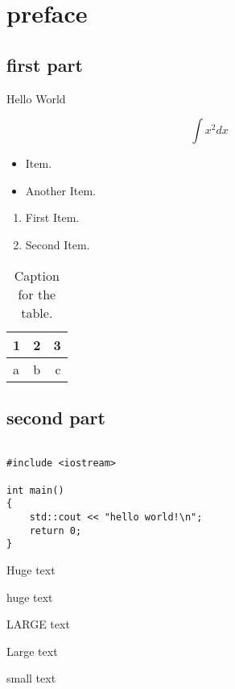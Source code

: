 \documentclass[12pt,a4paper]{article}
\begin{document}
\tableofcontents
\newpage


\section{preface}


\subsection{first part}

{
	\LARGE 
	Hello World\newline
}

{
	\Large
	\begin{equation}
	\int x^{2} dx
	\end{equation}
}




\begin{itemize}
	\item Item.
	\item Another Item.
\end{itemize}

\begin{enumerate}
	\item First Item.
	\item Second Item.
\end{enumerate}


\begin{table}[h!]
  \centering
  \caption{Caption for the table.}
  \label{tab:table1}
  \begin{tabular}{l|c||r}
    1 & 2 & 3\\
    \hline
    a & b & c\\
  \end{tabular}
\end{table}

\newpage
\subsection{second part}

\begin{verbatim}

#include <iostream>

int main()
{
	std::cout << "hello world!\n";
	return 0;
}
\end{verbatim}

{
\Huge
Huge text
}

{
\huge
huge text
}

{
\LARGE
LARGE text
}

{
\large
Large text
}

{
\small
small text
}
\end{document}
